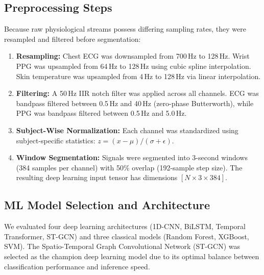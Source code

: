 \documentclass[11pt,a4paper]{article}
\begin{document}
\subsection{Preprocessing Steps}
Because raw physiological streams possess differing sampling rates, they were resampled and filtered before segmentation:
\begin{enumerate}
    \item \textbf{Resampling:} Chest ECG was downsampled from 700\,Hz to 128\,Hz. Wrist PPG was upsampled from 64\,Hz to 128\,Hz using cubic spline interpolation. Skin temperature was upsampled from 4\,Hz to 128\,Hz via linear interpolation.
    \item \textbf{Filtering:} A 50\,Hz IIR notch filter was applied across all channels. ECG was bandpass filtered between 0.5\,Hz and 40\,Hz (zero-phase Butterworth), while PPG was bandpass filtered between 0.5\,Hz and 5.0\,Hz.
    \item \textbf{Subject-Wise Normalization:} Each channel was standardized using subject-specific statistics: $z = (x - \mu) / (\sigma + \epsilon)$.
    \item \textbf{Window Segmentation:} Signals were segmented into 3-second windows (384 samples per channel) with 50\% overlap (192-sample step size). The resulting deep learning input tensor has dimensions $[N \times 3 \times 384]$.
\end{enumerate}

\subsection{ML Model Selection and Architecture}
We evaluated four deep learning architectures (1D-CNN, BiLSTM, Temporal Transformer, ST-GCN) and three classical models (Random Forest, XGBoost, SVM). The Spatio-Temporal Graph Convolutional Network (ST-GCN) was selected as the champion deep learning model due to its optimal balance between classification performance and inference speed.
\end{document}
